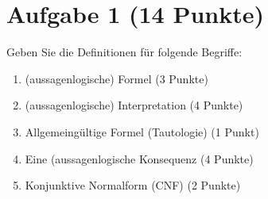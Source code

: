 
\section*{Aufgabe 1 (14 Punkte)}
Geben Sie die Definitionen für folgende Begriffe:
\begin{enumerate}
\item (aussagenlogische) Formel (3 Punkte)
\item (aussagenlogische) Interpretation (4 Punkte)
\item Allgemeingültige Formel (Tautologie) (1 Punkt)
\item Eine (aussagenlogische Konsequenz (4 Punkte)
\item Konjunktive Normalform (CNF) (2 Punkte)
\end{enumerate}
